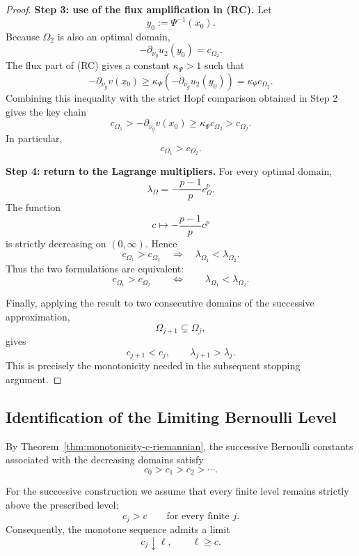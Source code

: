 \documentclass[11pt,a4paper]{article}
\theoremstyle{definition}
\theoremstyle{remark}
\begin{document}
\begin{proof}
\medskip
\noindent\textbf{Step 3: use of the flux amplification in {\rm (RC)}.}
Let
\[
y_0:=\Psi^{-1}(x_0).
\]
Because $\Omega_2$ is also an optimal domain,
\[
-\partial_{\nu_g}u_2(y_0)=c_{\Omega_2}.
\]
The flux part of {\rm (RC)} gives a constant $\kappa_\Psi>1$ such that
\[
-\partial_{\nu_g}v(x_0)
\geq
\kappa_\Psi
\left(
-\partial_{\nu_g}u_2(y_0)
\right)
=
\kappa_\Psi c_{\Omega_2}.
\]
Combining this inequality with the strict Hopf comparison obtained in
Step 2 gives the key chain
\[
c_{\Omega_1}
>
-\partial_{\nu_g}v(x_0)
\geq
\kappa_\Psi c_{\Omega_2}
>
c_{\Omega_2}.
\]
In particular,
\[
c_{\Omega_1}>c_{\Omega_2}.
\]

\medskip
\noindent\textbf{Step 4: return to the Lagrange multipliers.}
For every optimal domain,
\[
\lambda_\Omega
=
-\frac{p-1}{p}c_\Omega^p.
\]
The function
\[
c\longmapsto-\frac{p-1}{p}c^p
\]
is strictly decreasing on $(0,\infty)$. Hence
\[
c_{\Omega_1}>c_{\Omega_2}
\quad\Longrightarrow\quad
\lambda_{\Omega_1}<\lambda_{\Omega_2}.
\]
Thus the two formulations are equivalent:
\[
c_{\Omega_1}>c_{\Omega_2}
\qquad\Longleftrightarrow\qquad
\lambda_{\Omega_1}<\lambda_{\Omega_2}.
\]

Finally, applying the result to two consecutive domains of the
successive approximation,
\[
\Omega_{j+1}\subsetneq\Omega_j,
\]
gives
\[
c_{j+1}<c_j,
\qquad
\lambda_{j+1}>\lambda_j.
\]
This is precisely the monotonicity needed in the subsequent stopping
argument.
\end{proof}


\subsection{Identification of the Limiting Bernoulli Level}
\label{sec:identification-limiting-level}

By Theorem~\ref{thm:monotonicity-c-riemannian}, the successive
Bernoulli constants associated with the decreasing domains satisfy
\begin{equation}
c_0>c_1>c_2>\cdots.
\label{eq:decreasing-bernoulliconstants}
\end{equation}

For the successive construction we assume that every finite level
remains strictly above the prescribed level:
\begin{equation}
c_j>c
\qquad\text{for every finite }j.
\label{eq:levels-above-c}
\end{equation}
Consequently, the monotone sequence admits a limit
\begin{equation}
c_j\downarrow\ell,
\qquad
\ell\geq c.
\label{eq:level-limit}
\end{equation}
\end{document}

